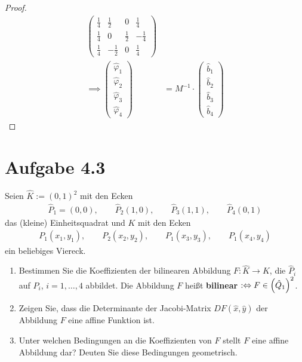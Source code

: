 \documentclass[12pt,a4paper]{article}
\begin{document}
\begin{proof}
\begin{align*}
\begin{pmatrix}
\frac{1}{4} & \frac{1}{2} & 0 & \frac{1}{4}\\
\frac{1}{4} & 0 & \frac{1}{2} & -\frac{1}{4}\\
\frac{1}{4} & -\frac{1}{2} & 0 & \frac{1}{4}
\end{pmatrix}\\
\implies\begin{pmatrix}
\hat{\varphi}_1\\ \hat{\varphi}_2 \\ \hat{\varphi}_3 \\ \hat{\varphi}_4
\end{pmatrix}&=M^{-1}\cdot\begin{pmatrix}
\hat{b}_1\\ \hat{b}_2 \\ \hat{b}_3 \\ \hat{b}_4
\end{pmatrix}
\end{align*}
	
\end{proof}

\section*{Aufgabe 4.3}
Seien $\hat{K}:=(0,1)^2$ mit den Ecken 
\begin{align*}
\hat{P}_1=(0,0),\qquad
\hat{P}_2(1,0),\qquad
\hat{P}_3(1,1),\qquad
\hat{P}_4(0,1)
\end{align*}
das (kleine) Einheitsquadrat und $K$ mit den Ecken
\begin{align*}
P_1(x_1,y_1),\qquad
P_2(x_2,y_2),\qquad
P_1(x_3,y_3),\qquad
P_1(x_4,y_4)
\end{align*}
ein beliebiges Viereck.
\begin{enumerate}[label=(\alph*)]
\item Bestimmen Sie die Koeffizienten der bilinearen Abbildung $F:\hat{K}\to K$, die $\hat{P}_i$ auf $P_i$, $i=1,\ldots,4$ abbildet. Die Abbildung $F$ heißt \textbf{bilinear} $:\Leftrightarrow F\in\left(\hat{Q}_1\right)^2$.
\item Zeigen Sie, dass die Determinante der Jacobi-Matrix $DF(\hat{x},\hat{y})$ der Abbildung $F$ eine affine Funktion ist.
\item Unter welchen Bedingungen an die Koeffizienten von $F$ stellt $F$ eine affine Abbildung dar? Deuten Sie diese Bedingungen geometrisch.
\end{enumerate}
\end{document}
